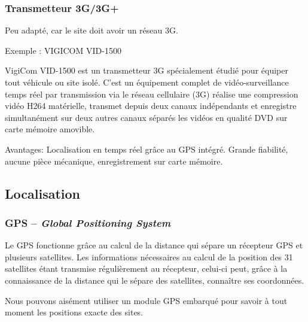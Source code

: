 \subsubsection{Transmetteur 3G/3G+}

Peu adapté, car le site doit avoir un réseau 3G.

Exemple : VIGICOM VID-1500

\begin{figure}
\begin{center}


\end{center}
\end{figure}

VigiCom VID-1500 est un transmetteur  3G spécialement étudié pour équiper tout véhicule ou site isolé. C’est un équipement complet de vidéo-surveillance temps réel par transmission via le réseau cellulaire (3G) réalise une compression vidéo H264 matérielle, transmet depuis deux canaux indépendants et enregistre simultanément sur deux autres canaux séparés les vidéos en qualité DVD sur carte mémoire amovible.

Avantages:
Localisation en temps réel grâce au GPS intégré. 
Grande fiabilité, aucune pièce mécanique, enregistrement sur carte mémoire.
\subsection{Localisation}

\subsubsection{GPS – \textsl{Global Positioning System}}

Le GPS fonctionne grâce au calcul de la distance qui sépare un récepteur GPS et plusieurs satellites. Les informations nécessaires au calcul de la position des 31 satellites étant transmise régulièrement au récepteur, celui-ci peut, grâce à la connaissance de la distance qui le sépare des satellites, connaître ses coordonnées.

Nous pouvons aisément utiliser un module GPS embarqué pour savoir à tout moment les positions exacte des sites.

